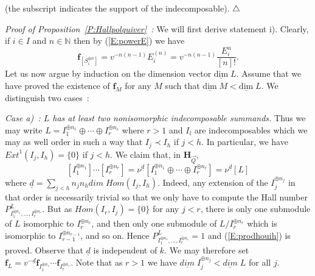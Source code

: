 \documentclass[a4paper,10pt]{amsart}
\def\H{\mathbf{H}}
\def\endexample{$\hfill \triangle$}
\def\N{\mathbb{N}}
\numberwithin{equation}{section}
\begin{document}
\vspace{.3in}

\noindent
(the subscript indicates the support of the indecomposable).
\endexample

\vspace{.2in}

\noindent
\textit{Proof of Proposition~\ref{P:Hallpolquiver}~:} We will first derive statement i). Clearly, if $i \in I$ and $n \in \N$ then by (\ref{E:powerE}) we have
$$\mathbf{f}_{[S_i^{\oplus n}]}=v^{-n(n-1)}E_i^{(n)}=v^{-n(n-1)}\frac{E_i^n}{[n]!}.$$
Let us now argue by induction on the dimension vector $\underline{\text{dim}}\;L$. Assume that
we have proved the existence of $\mathbf{f}_{M}$ for any $M$ such that $\underline{\text{dim}}\;M < \underline{\text{dim}}\;L$. We distinguish two cases~:

\vspace{.05in}

\noindent
\textit{Case a)~: $L$ has at least two nonisomorphic indecomposable summands.} Thus we may write $L=I_1^{\oplus n_1} \oplus \cdots \oplus I_r^{\oplus n_r}$ where $r >1$ and $I_l$ are indecomposables which we may as well order in such a way that $I_j \prec I_h$ if
$j <h$. In particular, we have ${Ext}^1(I_j,I_h)=\{0\}$ if $j < h$. We claim that, in $\H_{\vec{Q}}$,
\begin{equation}\label{E:prodhouih}
[I_1^{\oplus n_1}] \cdots [I_r^{\oplus n_r}]=\nu^{\underline{d}}[I_1^{\oplus n_1} \oplus \cdots \oplus I_r^{\oplus n_r}]=\nu^{\underline{d}}[L]
\end{equation}
where $\underline{d}=\sum_{j <h} n_jn_h {dim}\;{Hom}(I_j,I_h)$. Indeed, any extension of the
$I_j^{\oplus n_j}$ in that order is necessarily trivial so that we only have to compute the Hall number
$P^L_{I_1^{\oplus n_1}, \ldots, I_r^{\oplus n_r}}$. But as ${Hom}(I_r,I_j)=\{0\}$ for any $j <r$, there is only one submodule of $L$ isomorphic to $I_r^{\oplus n_r}$, and then only one submodule of
$L/I_r^{\oplus n_r}$ which is isomorphic to $I_{r-1}^{\oplus n_{r-1}}$, and so on. Hence $P^L_{I_1^{\oplus n_1}, \ldots, I_r^{\oplus n_r}}=1$ and (\ref{E:prodhouih}) is proved.
Observe that $\underline{d}$ is independent of $k$. We may therefore set $\mathbf{f}_L=v^{-\underline{d}} \mathbf{f}_{I_1^{\oplus n_1}} \cdots  \mathbf{f}_{I_r^{\oplus n_r}}$.
Note that as $r>1$ we have ${\underline{dim}}\;I_j^{\oplus n_j} < {\underline{dim}}\;L$ for all $j$.

\vspace{.05in}
\end{document}
